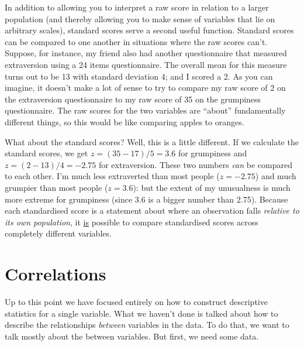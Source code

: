 In addition to allowing you to interpret a raw score in relation to a larger population (and thereby allowing you to make sense of variables that lie on arbitrary scales), standard scores serve a second useful function. Standard scores can be compared to one another in situations where the raw scores can't. Suppose, for instance, my friend also had another questionnaire that measured extraversion using a 24 items questionnaire. The overall mean for this measure turns out to be 13 with standard deviation 4; and I scored a 2. As you can imagine, it doesn't make a lot of sense to try to compare my raw score of 2 on the extraversion questionnaire to my raw score of 35 on the grumpiness questionnaire. The raw scores for the two variables are ``about'' fundamentally different things, so this would be like comparing apples to oranges.

What about the standard scores? Well, this is a little different. If we calculate the standard scores, we get $z = (35-17)/5 = 3.6$ for grumpiness and $z = (2-13)/4 = -2.75$ for extraversion. These two numbers {\it can} be compared to each other. I'm much less extraverted than most people ($z = -2.75$) and much grumpier than most people ($z = 3.6$): but the extent of my unusualness is much more extreme for grumpiness (since 3.6 is a bigger number than 2.75).  Because each standardised score is a statement about where an observation falls {\it relative to its own population}, it \underline{is} possible to compare standardised scores across completely different variables. 


\section{Correlations\label{sec:correl}}

Up to this point we have focused entirely on how to construct descriptive statistics for a single variable. What we haven't done is talked about how to describe the relationships {\it between} variables in the data. To do that, we want to talk mostly about the  between variables. But first, we need some data.



